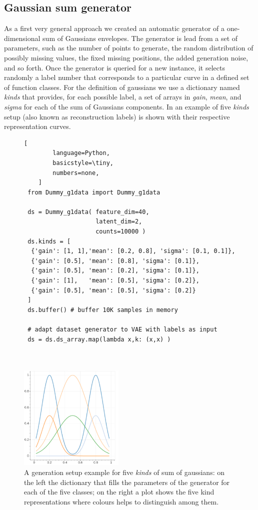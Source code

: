 \subsection{Gaussian sum generator}
\label{section: gaussian sum generator}
As a first very general approach we created an automatic generator of a one-dimensional sum of Gaussians envelopes. 
The generator is lead from a set of parameters, such as the number of points to generate, the random distribution of possibly missing values, the fixed missing positions, the added generation noise, and so forth. 
Once the generator is queried for a new instance, it selects randomly a label number that corresponds to a particular curve in a defined set of function classes. For the definition of gaussians we use a dictionary named \textit{kinds} that provides, for each possible label, a set of arrays in \textit{gain},  \textit{mean}, and \textit{sigma} for each of the sum of Gaussians components.
In \Figure{\ref{fig:sum_of_gaussians}} an example of five \textit{kinds} setup (also known as reconstruction labels) is shown with their respective representation curves. 
%
\begin{figure}
    \centering
    \begin{minipage}[b]{0.57\textwidth}
    \begin{lstlisting}[
        language=Python,
        basicstyle=\tiny,
        numbers=none,
    ]
 from Dummy_g1data import Dummy_g1data
 
 ds = Dummy_g1data( feature_dim=40, 
                    latent_dim=2, 
                    counts=10000 )
 ds.kinds = [
  {'gain': [1, 1],'mean': [0.2, 0.8], 'sigma': [0.1, 0.1]},
  {'gain': [0.5], 'mean': [0.8], 'sigma': [0.1]},
  {'gain': [0.5], 'mean': [0.2], 'sigma': [0.1]},
  {'gain': [1],   'mean': [0.5], 'sigma': [0.2]},
  {'gain': [0.5], 'mean': [0.5], 'sigma': [0.2]}
 ]
 ds.buffer() # buffer 10K samples in memory
 
 # adapt dataset generator to VAE with labels as input
 ds = ds.ds_array.map(lambda x,k: (x,x) )
 
 
    \end{lstlisting}
    \end{minipage}
    \hfill
    \begin{minipage}[b]{0.42\textwidth}
     \includegraphics[height=5cm]{img/STEP1/dummy_kinds.png}
    \end{minipage}
    \caption{A generation setup example for five \textit{kinds} of sum of gaussians: on the left the dictionary that fills the parameters of the generator for each of the five classes; on the right a plot shows the five kind representations where colours helps to distinguish among them. }
    \label{fig:sum_of_gaussians}
\end{figure}
